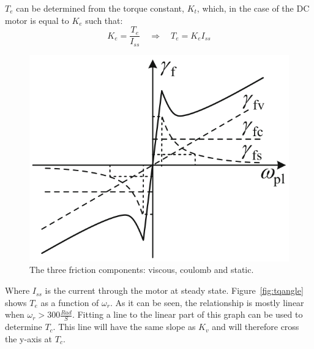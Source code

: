 $T_e$ can be determined from the torque constant, $K_t$, which, in the case of the DC motor is equal to $K_e$ such that:
$$K_e = \frac{T_e}{I_{ss}} \quad \Rightarrow \quad T_e = K_eI_{ss}$$

\begin{figure}[!h]
	\centering
	\includegraphics[width=.5\linewidth]{graphics/friction}
	\caption[The three friction components]{The three friction components: viscous, coulomb and static.}
	\label{fig:friction}
\end{figure}

Where $I_{ss}$ is the current through the motor at steady state.
Figure~\ref{fig:tqangle} shows $T_e$ as a function of $\omega_r$.
As it can be seen, the relationship is mostly linear when $\omega_r>300\frac{Rad}{S}$.
Fitting a line to the linear part of this graph can be used to determine $T_c$.
This line will have the same slope as $K_v$ and will therefore cross the y-axis at $T_c$.

